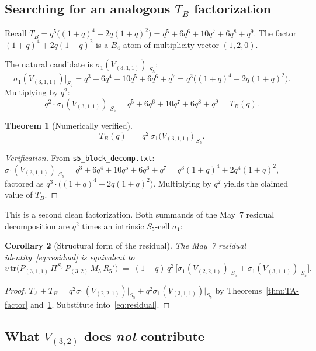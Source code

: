 \documentclass[11pt]{article}
\newtheorem{theorem}{Theorem}
\newtheorem{corollary}[theorem]{Corollary}
\theoremstyle{definition}
\begin{document}
\subsection*{Searching for an analogous $T_B$ factorization}

Recall $T_B = q^5\bigl((1+q)^4 + 2q(1+q)^2\bigr) = q^5 + 6q^6 + 10q^7 + 6q^8 + q^9$. The factor $(1+q)^4 + 2q(1+q)^2$ is a $B_4$-atom of multiplicity vector $(1, 2, 0)$.

The natural candidate is $\sigma_1(V_{(3,1,1)})\big|_{S_5}$:
\[
\sigma_1(V_{(3,1,1)})\big|_{S_5} = q^3 + 6q^4 + 10q^5 + 6q^6 + q^7 = q^3\bigl((1+q)^4 + 2q(1+q)^2\bigr).
\]
Multiplying by $q^2$:
\[
q^2 \cdot \sigma_1(V_{(3,1,1)})\big|_{S_5} = q^5 + 6q^6 + 10q^7 + 6q^8 + q^9 = T_B(q).
\]

\begin{theorem}[Numerically verified]\label{thm:TB-factor}
\[
T_B(q) \;=\; q^2\,\sigma_1\!\bigl(V_{(3,1,1)}\bigr)\big|_{S_5}.
\]
\end{theorem}

\begin{proof}[Verification]
From \texttt{s5\_block\_decomp.txt}: $\sigma_1(V_{(3,1,1)})\big|_{S_5} = q^3 + 6q^4 + 10q^5 + 6q^6 + q^7 = q^3(1+q)^4 + 2q^4(1+q)^2$, factored as $q^3 \cdot \bigl((1+q)^4 + 2q(1+q)^2\bigr)$. Multiplying by $q^2$ yields the claimed value of $T_B$.
\end{proof}

This is a second clean factorization. Both summands of the May~7 residual decomposition are $q^2$ times an intrinsic $S_5$-cell $\sigma_1$:

\begin{corollary}[Structural form of the residual]\label{cor:structural}
The May~7 residual identity~\eqref{eq:residual} is equivalent to
\begin{equation}\label{eq:structural}
v\,\mathrm{tr}\bigl(P_{(3,1,1)}\, \Pi^{S_5}\, P_{(3,2)}\, M_5\, R_5'\bigr)
\;=\; (1+q)\,q^2\,\bigl[\sigma_1(V_{(2,2,1)})\big|_{S_5} + \sigma_1(V_{(3,1,1)})\big|_{S_5}\bigr].
\end{equation}
\end{corollary}

\begin{proof}
$T_A + T_B = q^2 \sigma_1(V_{(2,2,1)})\big|_{S_5} + q^2 \sigma_1(V_{(3,1,1)})\big|_{S_5}$ by Theorems~\ref{thm:TA-factor} and~\ref{thm:TB-factor}. Substitute into~\eqref{eq:residual}.
\end{proof}

\subsection*{What $V_{(3,2)}$ does \emph{not} contribute}
\end{document}
